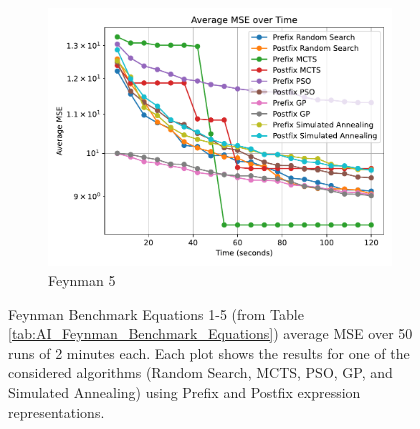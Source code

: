 \documentclass[runningheads]{llncs}
\begin{document}
\begin{figure}[]
    \vspace{0.5cm}
    
    \begin{subfigure}[b]{0.4\textwidth}
        \includegraphics[width=\linewidth, keepaspectratio]{AIFeynman_Benchmarks/Feynman_Benchmark_5.pdf}
        \caption{Feynman 5}
        \label{subfig:feynman_5}
    \end{subfigure}
    
    \caption{Feynman Benchmark Equations 1-5 (from Table \ref{tab:AI_Feynman_Benchmark_Equations}) average MSE over 50 runs of 2 minutes each. Each plot shows the results for one of the considered algorithms (Random Search, MCTS, PSO, GP, and Simulated Annealing) using Prefix and Postfix expression representations.}
    \label{fig:Feynman_Benchmarks}
\end{figure}

    
    
\end{document}
